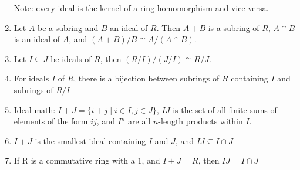 \documentclass{article}
\begin{document}
\begin{enumerate}[1.]
        Note: every ideal is the kernel of a ring homomorphism and vice
        versa.
    \item Let $A$ be a subring and $B$ an ideal of $R$. Then $A + B$ is a
        subring of $R$, $A \cap B$ is an ideal of $A$, and $(A+B)/B \cong
        A/(A \cap B)$.
    \item Let $I \subseteq J$ be ideals of $R$, then $(R/I)/(J/I) \cong
        R/J$.
    \item For ideals $I$ of $R$, there is a bijection between subrings of
    $R$ containing $I$ and subrings of $R/I$
    \item Ideal math: $I+J = \{i+j \mid i \in I, j \in J\}$, $IJ$ is the set
        of all finite sums of elements of the form $ij$, and $I^n$ are all
        $n$-length products within $I$.
    \item $I+J$ is the smallest ideal containing $I$ and $J$, and $IJ \subseteq
    I \cap J$
    \item If R is a commutative ring with a $1$, and $I+J = R$, then $IJ =
    I \cap J$
\end{enumerate}
\end{document}
